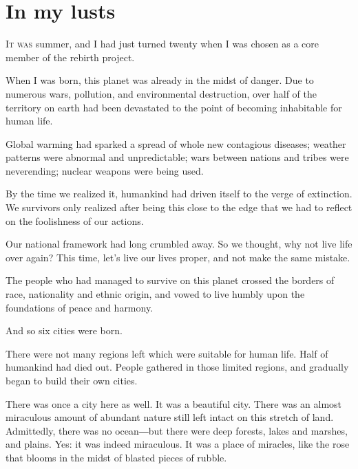 
\chapter{In my lusts}


\lettrine[ante=``]{I}{t was} summer, and I had just turned twenty when I was chosen as a core
member of the rebirth project.

When I was born, this planet was already in the midst of danger. Due to
numerous wars, pollution, and environmental destruction, over half of
the territory on earth had been devastated to the point of becoming
inhabitable for human life.

Global warming had sparked a spread of whole new contagious diseases;
weather patterns were abnormal and unpredictable; wars between nations
and tribes were neverending; nuclear weapons were being used.

By the time we realized it, humankind had driven itself to the verge of
extinction. We survivors only realized after being this close to the
edge that we had to reflect on the foolishness of our actions.

Our national framework had long crumbled away. So we thought, why not
live life over again? This time, let's live our lives proper, and not
make the same mistake.

The people who had managed to survive on this planet crossed the borders
of race, nationality and ethnic origin, and vowed to live humbly upon
the foundations of peace and harmony.

And so six cities were born.

There were not many regions left which were suitable for human life.
Half of humankind had died out. People gathered in those limited
regions, and gradually began to build their own cities.

There was once a city here as well. It was a beautiful city. There was
an almost miraculous amount of abundant nature still left intact on this
stretch of land. Admittedly, there was no ocean―but there were deep
forests, lakes and marshes, and plains. Yes: it was indeed miraculous.
It was a place of miracles, like the rose that blooms in the midst of
blasted pieces of rubble.

